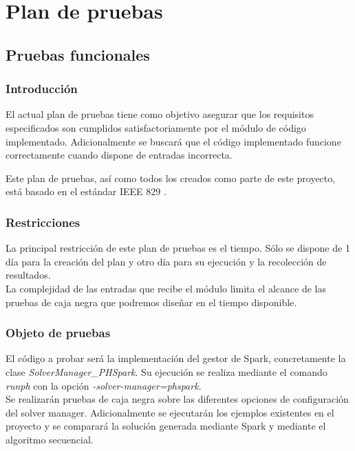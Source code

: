 \chapter{Plan de pruebas}
\label{ch:pruebas}

\section{Pruebas funcionales}

\subsection{Introducción}

El actual plan de pruebas tiene como objetivo asegurar que los requisitos especificados son cumplidos satisfactoriamente por el módulo de código implementado. Adicionalmente se buscará que el código implementado funcione correctamente cuando dispone de entradas incorrecta.

Este plan de pruebas, así como todos los creados como parte de este proyecto, está basado en el estándar IEEE 829 \cite{IEEE829}.

\subsection{Restricciones}

La principal restricción de este plan de pruebas es el tiempo. Sólo se dispone de 1 día para la creación del plan y otro día para su ejecución y la recolección de resultados.\\

La complejidad de las entradas que recibe el módulo limita el alcance de las pruebas de caja negra que podremos diseñar en el tiempo disponible.

\subsection{Objeto de pruebas}

El código a probar será la implementación del gestor de Spark, concretamente la clase {\it SolverManager\_PHSpark}. Su ejecución se realiza mediante el comando {\it runph} con la opción {\it -\-solver-manager=phspark}.\\

Se realizarán pruebas de caja negra sobre las diferentes opciones de configuración del solver manager. Adicionalmente se ejecutarán los ejemplos existentes en el proyecto y se comparará la solución generada mediante Spark y mediante el algoritmo secuencial.

